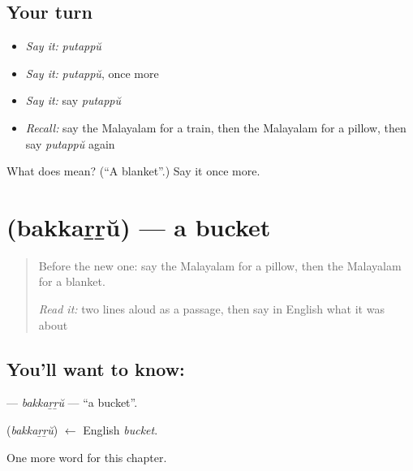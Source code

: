\subsection*{Your turn}
\begin{itemize}
\raggedright
  \item \emph{Say it:} \emph{putappŭ}
  \item \emph{Say it:} \emph{putappŭ}, once more
  \item \emph{Say it:} say \emph{putappŭ}
  \item \emph{Recall:} say the Malayalam for a train, then the Malayalam for a pillow, then say \emph{putappŭ} again
\end{itemize}

\begin{tcolorbox}[breakable,colback=teal!4,colframe=teal!35!black,title={Before you move on}]
What does  mean? (\textquotedblleft{}A blanket\textquotedblright{}.) Say it once more.
\end{tcolorbox}
\section[\texorpdfstring{\ml{ബക്കറ്റ്} (bakkaṟṟŭ)}{ബക്കറ്റ് (bakkaṟṟŭ)}]{ (bakkaṟṟŭ) — a bucket}

\label{lesson:ML-C158-bakkarru}



\begin{quote}
Before the new one: say the Malayalam for a pillow, then the Malayalam for a blanket.

\emph{Read it:} two lines aloud as a passage, then say in English what it was about
\end{quote}

\subsection*{You'll want to know: }
\textbf{} — \emph{bakkaṟṟŭ} — \textquotedblleft{}a bucket\textquotedblright{}.

\begin{cousinweb}
\textbf{} (\emph{bakkaṟṟŭ}) $\leftarrow$ English \emph{bucket}.
\end{cousinweb}

\begin{grammarlens}[title={What you've built}]
One more word for this chapter.
\end{grammarlens}

